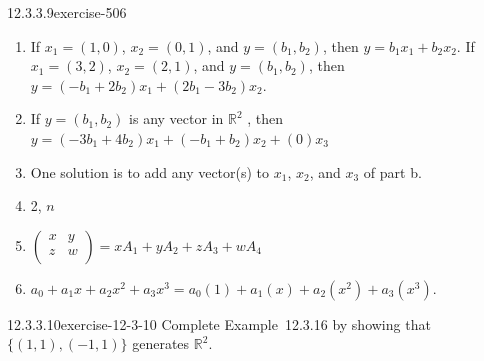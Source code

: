 \documentclass[twoside,10pt,]{book}
\numberwithin{equation}{section}
\begin{document}
\begin{divisionsolution}{12.3.3.9}{}{exercise-506}
\begin{enumerate}[label=(\alph*)]
\item\hypertarget{li-2081}{}\hypertarget{p-4544}{}%
If \(x_1 = (1, 0)\), \(x_2= (0, 1)\), and \(y = \left(b_1, b_2\right)\), then \(y = b_1x_1+b_2x_2\).   If  \(x_1 = (3, 2)\), \(x_2= (2,1)\), and \(y = \left(b_1, b_2\right)\), then \(y =\left(- b_1+2b_2\right)x_1+\left(2b_1-3b_2\right)x_2\).%
\item\hypertarget{li-2082}{}\hypertarget{p-4545}{}%
If \(y = \left(b_1, b_2\right)\) is any vector in \(\mathbb{R}^2\) , then \(y =\left(- 3b_1+4b_2\right)x_1+\left(-b_1+b_2\right)x_2 + (0)x_3\)%
\item\hypertarget{li-2083}{}\hypertarget{p-4546}{}%
One solution is to add any vector(s) to \(x_1\), \(x_2\), and \(x_3\) of part b.%
\item\hypertarget{li-2084}{}\hypertarget{p-4547}{}%
2, \(n\)%
\item\hypertarget{li-2085}{}\hypertarget{p-4548}{}%
\(\left(
\begin{array}{cc}
x & y \\
z & w \\
\end{array}
\right)= x A_1+y A_2+ z A_3+ w A_4\)%
\item\hypertarget{li-2086}{}\hypertarget{p-4549}{}%
\(a_0+a_1x + a_2x^2+ a_3x^3=a_0(1)+a_1(x) + a_2\left(x^2\right)+ a_3\left(x^3\right)\).%
\end{enumerate}
%
\end{divisionsolution}%
\begin{divisionsolution}{12.3.3.10}{}{exercise-12-3-10}%
\hypertarget{p-4550}{}%
Complete Example~12.3.16 by showing that \(\{(1, 1), (-1, 1)\}\) generates \(\mathbb{R}^2\).%
\end{divisionsolution}%
\end{document}
